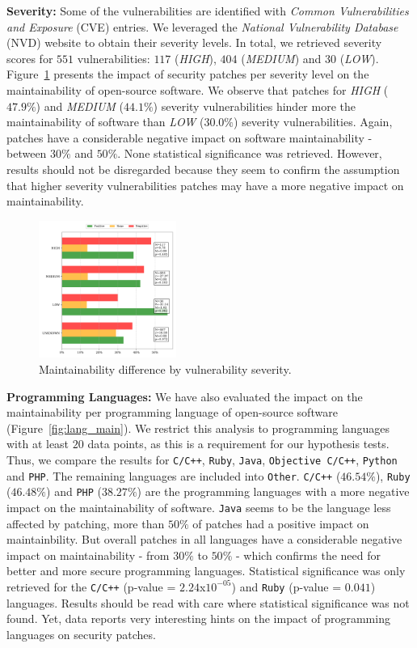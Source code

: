 \documentclass[10pt,conference]{IEEEtran}
\begin{document}
\textbf{Severity:} Some of the vulnerabilities are identified with \emph{Common 
Vulnerabilities and Exposure} (CVE) entries. We leveraged the \emph{National Vulnerability 
Database} (NVD) website to obtain their severity levels. In total, we 
retrieved severity scores for $551$ vulnerabilities: $117$ (\emph{HIGH}), 
$404$ (\emph{MEDIUM}) and $30$ (\emph{LOW}). Figure~\ref{fig:severity} 
presents the impact of security patches per severity level on the 
maintainability of open-source software. We observe that patches for 
\emph{HIGH} ($47.9\%$) and \emph{MEDIUM} ($44.1\%$) severity vulnerabilities 
hinder more the maintainability of software than \emph{LOW} ($30.0\%$) 
severity vulnerabilities. Again, patches have a considerable 
negative impact on software maintainability - between $30\%$ 
and $50\%$. None statistical significance was retrieved. However, 
results should not be disregarded because they seem to confirm the 
assumption that higher severity vulnerabilities patches may have a 
more negative impact on maintainability.

\begin{figure}[h]
 	\centering 	\includegraphics[width=0.4\textwidth]{figures/main_per_severity.pdf}
 	\caption{Maintainability difference by vulnerability severity.}
	\label{fig:severity}
\end{figure}

\textbf{Programming Languages:} We have also evaluated the impact on the maintainability per programming 
language of open-source software (Figure~\ref{fig:lang_main}). We restrict 
this analysis to programming languages with at least $20$ data points, as this 
is a requirement for our hypothesis tests. Thus, we compare the results for 
\texttt{C/C++}, \texttt{Ruby}, \texttt{Java}, \texttt{Objective C/C++}, 
\texttt{Python} and \texttt{PHP}. The remaining languages are included into 
\texttt{Other}. \texttt{C/C++} ($46.54\%$), \texttt{Ruby} ($46.48\%$) and 
\texttt{PHP} ($38.27\%$) are the programming languages with a more negative
impact on the maintainability of software. \texttt{Java} seems to be the 
language less affected by patching, more than $50\%$ of patches had a positive 
impact on maintainbility. But overall patches in all languages have a 
considerable negative impact on maintainability - from $30\%$ to $50\%$ - which 
confirms the need for better and more secure programming languages. 
Statistical significance was only retrieved for the \texttt{C/C++} 
(p-value = $2.24$x$10^{-05}$) and \texttt{Ruby} (p-value = $0.041$) languages.
Results should be read with care where statistical significance was not found.
Yet, data reports very interesting hints on the impact of programming languages 
on security patches.
\end{document}
